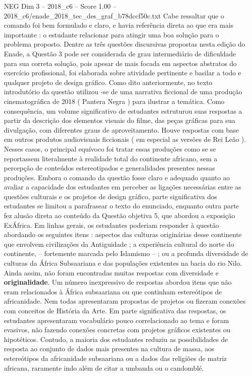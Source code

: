 \begin{textsample}{NEG Dim 3 – 2018\_c6 – Score 1.00 – 2018\_c6/enade\_2018\_tec\_des\_graf\_b78dccf50c.txt}
Cabe ressaltar que o comando foi bem formulado e claro, e havia referência direta ao que era mais importante : o estudante relacionar para atingir uma boa solução para o problema proposto.
Dentre as três questões discursivas propostas nesta edição do Enade, a Questão 3 pode ser considerada de grau intermediário de dificuldade para sua correta solução, pois apesar de mais focada em aspectos abstratos do exercício profissional, foi elaborada sobre atividade pertinente e basilar a todo e qualquer projeto de design gráfico.
Como dito anteriormente, no texto introdutório da questão utilizou -se de uma narrativa ficcional de uma produção cinematográfica de 2018 ( Pantera Negra ) para ilustrar a temática.
Como consequência, um volume significativo de estudantes estruturou suas respostas a partir da descrição dos elementos visuais do filme, das peças gráficas para sua divulgação, com diferentes graus de aproveitamento.
Houve respostas com base em outros produtos audiovisuais ficcionais ( em especial as versões de Rei Leão ).
Nesses casos, o principal equívoco foi tratar essas produções como se se reportassem literalmente à realidade total do continente africano, sem a percepção de conteúdos estereotipados e generalidades presentes nessas produções.
Embora o comando da questão fosse claro e adequado quanto ao avaliar a capacidade dos estudantes em perceber as ligações necessárias entre as questões culturais e os projetos de design gráfico, parte significativa dos estudantes se limitou a parafrasear o texto do enunciado, enquanto outra parte fez alusão direta ao conteúdo da Questão objetiva 5, que abordou a exposição ExÁfrica.
Em linhas gerais, os estudantes poderiam responder à questão abordando os seguintes itens : aspectos das culturas originárias desse continente que envolvem civilizações da Antiguidade ; a experiência cultural do norte do continente, – fortemente marcada pelo Islamismo – ; ou a profunda diversidade de culturas da África Subsaariana e das populações existentes na bacia do rio Nilo.
Ainda assim, não foram encontradas muitas respostas com diversidade e \textbf{originalidade}.
Um número inexpressivo de respostas abordou itens que não eram relacionados à África subsaariana ou que continham estereótipos de africanidade.
Nem todas apresentaram propostas de projetos ou fizeram conexões com conceitos de História da Arte.
Em parte significativa das respostas, os estudantes apresentaram vocabulário pouco correlacionado ao tema e foram evasivos, não fazendo conexões concretas com projetos gráficos existentes ou hipotéticos.
Contudo, a maioria dos estudantes reduziu as possibilidades de resposta ao conjunto de dados mais presentes na cultura de massa, aos estereótipos da africanidade subsaariana ou a dados das religiões de matriz africana, raramente indo além de citar a umbanda ou o candomblé.

\end{textsample}
